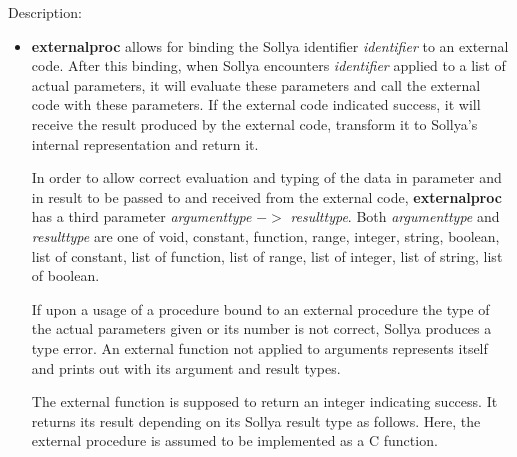 \noindent Description: \begin{itemize}

\item \textbf{externalproc} allows for binding the Sollya identifier
   \emph{identifier} to an external code.  After this binding, when Sollya
   encounters \emph{identifier} applied to a list of actual parameters, it
   will evaluate these parameters and call the external code with these
   parameters. If the external code indicated success, it will receive
   the result produced by the external code, transform it to Sollya's
   internal representation and return it.
    
   In order to allow correct evaluation and typing of the data in
   parameter and in result to be passed to and received from the external
   code, \textbf{externalproc} has a third parameter \emph{argumenttype} $->$ \emph{resulttype}.
   Both \emph{argumenttype} and \emph{resulttype} are one of void, constant,
   function, range, integer, string, boolean, list of constant, list of
   function, list of range, list of integer, list of string, list of
   boolean.
    
   If upon a usage of a procedure bound to an external procedure the type
   of the actual parameters given or its number is not correct, Sollya
   produces a type error. An external function not applied to arguments
   represents itself and prints out with its argument and result types.
    
   The external function is supposed to return an integer indicating
   success.  It returns its result depending on its Sollya result type
   as follows. Here, the external procedure is assumed to be implemented
   as a C function.
    

\end{itemize}
